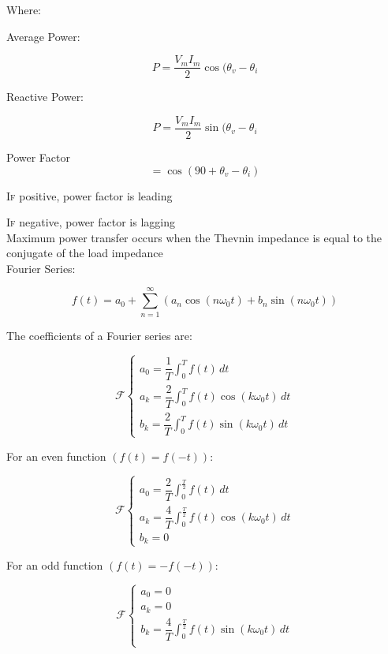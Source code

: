   \begin{center}
    Where:
  \end{center}

  \begin{multicols}{2}

    Average Power:

    $$\boxed{P=\dfrac{V_mI_m}{2}\cos(\theta_v - \theta_i}$$

    Reactive Power:

    $$\boxed{P=\dfrac{V_mI_m}{2}\sin(\theta_v - \theta_i}$$

  \end{multicols}

    Power Factor $$=\cos(90+\theta_v-\theta_i)$$

    \textsc{If} positive, power factor is leading

    \textsc{If} negative, power factor is lagging\\

    Maximum power transfer occurs when the Thevnin impedance is equal to the conjugate of the load impedance\\

    Fourier Series:

    $$\boxed{f(t)=a_0+\sum_{n=1}^{\infty} \left(a_n\cos(n\omega_0t)+b_n\sin(n\omega_0t)\right)}$$

    The coefficients of a Fourier series are:

 $$\mathcal{F}\left\{\begin{array}{c} a_0=\dfrac{1}{T}\displaystyle \int_0^T f(t)\,dt\\ a_k=\dfrac{2}{T}\displaystyle\int_0^T f(t)\cos(k\omega_0t)\,dt\\b_k=\dfrac{2}{T}\displaystyle\int_0^T f(t)\sin(k\omega_0t)\,dt \end{array}$$

For an even function $(f(t)=f(-t))$:

  $$\mathcal{F}\left\{\begin{array}{c} a_0=\dfrac{2}{T}\displaystyle \int_0^{\frac{T}{2}} f(t)\,dt\\ a_k=\dfrac{4}{T}\displaystyle\int_0^{\frac{T}{2}} f(t)\cos(k\omega_0t)\,dt\\b_k=0 \end{array}$$

For an odd function $(f(t)=-f(-t))$:

  $$\mathcal{F}\left\{\begin{array}{c} a_0=0\\ a_k=0\\ b_k=\dfrac{4}{T}\displaystyle\int_0^{\frac{T}{2}} f(t)\sin(k\omega_0t)\,dt\\ \end{array}$$


